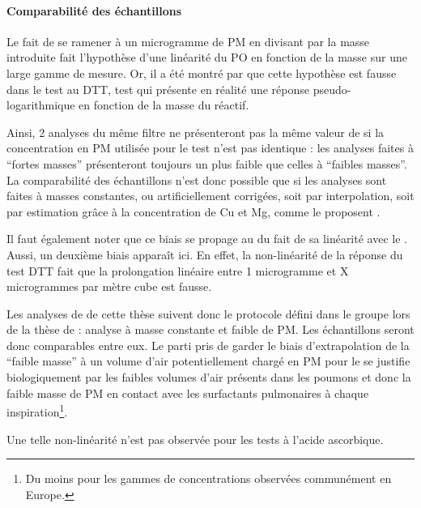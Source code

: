 \paragraph{Comparabilité des échantillons}%
\label{par:comparabilité_des_échantillons}

Le fait de se ramener à un microgramme de PM en divisant par la masse introduite fait
l'hypothèse d'une linéarité du PO en fonction de la masse sur une large gamme de mesure. Or, il a été montré par
\textcite{charrierDithiothreitol2012,charrierBias2016,calasComparison2018} que cette
hypothèse est fausse dans le test au DTT, test qui présente en réalité une réponse
pseudo-logarithmique en fonction de la masse du réactif.

Ainsi, 2 analyses du même filtre ne présenteront pas la même valeur de \PODTTm{} si la
concentration en PM utilisée pour le test n'est pas identique : les analyses faites à ``fortes masses''
présenteront toujours un \PODTTm{} plus faible que celles à ``faibles masses''.
La comparabilité des échantillons n'est donc possible que si les analyses sont faites à
masses constantes, ou artificiellement corrigées, soit par interpolation, soit par
estimation grâce à la concentration de Cu et Mg, comme le proposent
\textcite{charrierBias2016}.

Il faut également noter que ce biais se propage au \PODTTv{} du fait de sa linéarité avec le
\PODTTm. Aussi, un deuxième biais apparaît ici. En effet, la non-linéarité de la réponse
du test DTT fait
que la prolongation linéaire entre 1 microgramme et X microgrammes par mètre cube est
fausse.

Les analyses de \PODTT{} de cette thèse suivent donc le protocole défini dans le groupe lors de la thèse
de \textcite{calasPollution2017} : analyse à masse constante et faible de PM. Les
échantillons seront donc comparables entre eux. Le parti pris de garder le biais
d'extrapolation de la ``faible masse'' à un volume d'air potentiellement chargé en PM
pour le \PODTTv{} se justifie biologiquement par les faibles volumes d'air présents dans les
poumons et donc la faible masse de PM en contact avec les surfactants pulmonaires à
chaque inspiration\footnote{Du moins pour les gammes de concentrations observées
communément en Europe.}.

Une telle non-linéarité n'est pas observée pour les tests à l'acide ascorbique.

